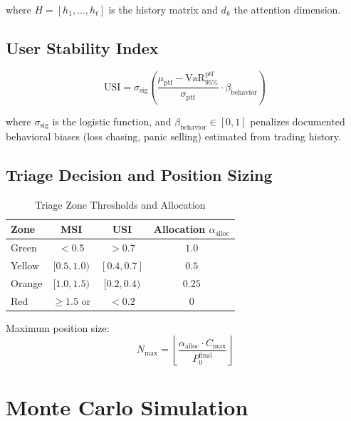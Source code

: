 \documentclass[12pt]{article}
\begin{document}
where $H = [h_1, \ldots, h_t]$ is the history matrix and $d_k$ the attention dimension.

\subsection{User Stability Index}

\begin{equation}
    \text{USI} = \sigma_{\text{sig}}\!\left(
        \frac{\mu_{\text{ptf}} - \text{VaR}_{95\%}^{\text{ptf}}}{\sigma_{\text{ptf}}}
        \cdot \beta_{\text{behavior}}
    \right)
\end{equation}

where $\sigma_{\text{sig}}$ is the logistic function, and $\beta_{\text{behavior}} \in [0,1]$
penalizes documented behavioral biases (loss chasing, panic selling) estimated from trading history.

\subsection{Triage Decision and Position Sizing}\label{sec:sizing}

\begin{table}[h]
\centering
\caption{Triage Zone Thresholds and Allocation}
\begin{tabular}{lccc}
\toprule
\textbf{Zone} & \textbf{MSI} & \textbf{USI} & \textbf{Allocation $\alpha_{\text{alloc}}$} \\
\midrule
Green  & $< 0.5$ & $> 0.7$ & $1.0$ \\
Yellow & $[0.5, 1.0)$ & $[0.4, 0.7]$ & $0.5$ \\
Orange & $[1.0, 1.5)$ & $[0.2, 0.4)$ & $0.25$ \\
Red    & $\geq 1.5$ or & $< 0.2$ & $0$ \\
\bottomrule
\end{tabular}
\end{table}

Maximum position size:
\begin{equation}
    N_{\max} = \left\lfloor \frac{\alpha_{\text{alloc}} \cdot C_{\max}}{P_0^{\text{final}}} \right\rfloor
\end{equation}

\section{Monte Carlo Simulation}\label{sec:mc}
\end{document}
